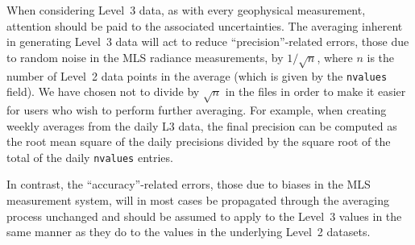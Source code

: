 When considering Level~3 data, as with every geophysical measurement, attention should be paid to the associated uncertainties. The averaging inherent in generating Level~3 data will act to reduce \mbox{``precision''-related} errors, those due to random noise in the MLS radiance measurements, by $1/\sqrt{n}$, where $n$ is the number of Level~2 data points in the average (which is given by the \texttt{nvalues} field). We have chosen not to divide by $\sqrt{n}$ in the files in order to make it easier for users who wish to perform further averaging. For example, when creating weekly averages from the daily L3 data, the final precision can be computed as the root mean square of the daily precisions divided by the square root of the total of the daily \verb+nvalues+ entries.

In contrast, the ``accuracy''-related errors, those due to biases in the MLS measurement system, will in most cases be propagated through the averaging process unchanged and should be assumed to apply to the Level~3 values in the same manner as they do to the values in the underlying Level~2 datasets.